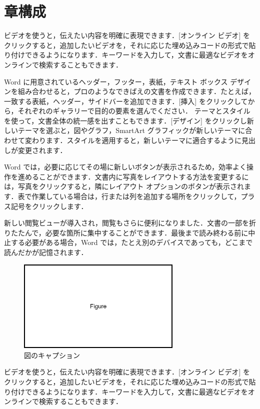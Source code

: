 \section{章構成}

ビデオを使うと，伝えたい内容を明確に表現できます．[オンライン ビデオ] をクリックすると，追加したいビデオを，それに応じた埋め込みコードの形式で貼り付けできるようになります．キーワードを入力して，文書に最適なビデオをオンラインで検索することもできます．

Word に用意されているヘッダー，フッター，表紙，テキスト ボックス デザインを組み合わせると，プロのようなできばえの文書を作成できます．たとえば，一致する表紙，ヘッダー，サイドバーを追加できます．[挿入] をクリックしてから，それぞれのギャラリーで目的の要素を選んでください．
テーマとスタイルを使って，文書全体の統一感を出すこともできます．[デザイン] をクリックし新しいテーマを選ぶと，図やグラフ，SmartArt グラフィックが新しいテーマに合わせて変わります．スタイルを適用すると，新しいテーマに適合するように見出しが変更されます．

Word では，必要に応じてその場に新しいボタンが表示されるため，効率よく操作を進めることができます．文書内に写真をレイアウトする方法を変更するには，写真をクリックすると，隣にレイアウト オプションのボタンが表示されます．表で作業している場合は，行または列を追加する場所をクリックして，プラス記号をクリックします．

新しい閲覧ビューが導入され，閲覧もさらに便利になりました．文書の一部を折りたたんで，必要な箇所に集中することができます．最後まで読み終わる前に中止する必要がある場合，Word では，たとえ別のデバイスであっても，どこまで読んだかが記憶されます．

\begin{figure}
    \centering
    \includegraphics[width=0.7\textwidth]{fig1.png}
    \caption{図のキャプション}
    \label{fig:my_label}
\end{figure}

ビデオを使うと，伝えたい内容を明確に表現できます．[オンライン ビデオ] をクリックすると，追加したいビデオを，それに応じた埋め込みコードの形式で貼り付けできるようになります．キーワードを入力して，文書に最適なビデオをオンラインで検索することもできます．


